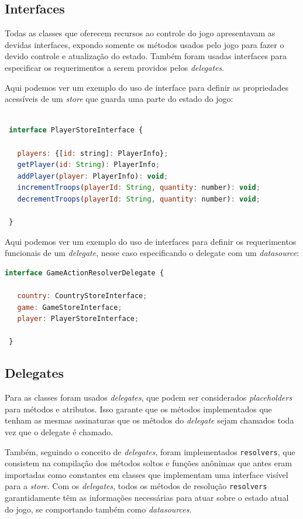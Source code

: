 \documentclass[rel_mlp]{iiufrgs}
\begin{document}
\subsection{Interfaces}
Todas as classes que oferecem recursos ao controle do jogo apresentavam as devidas interfaces, expondo somente os métodos usados pelo jogo para fazer o devido controle e atualização do estado.
Também foram usadas interfaces para especificar os requerimentos a serem providos pelos \textit{delegates}.
\par

Aqui podemos ver um exemplo do uso de interface para definir as propriedades acessíveis de um \textit{store} que guarda uma parte do estado do jogo:

\begin{lstlisting}[language=JavaScript]

 interface PlayerStoreInterface {

   players: {[id: string]: PlayerInfo};
   getPlayer(id: String): PlayerInfo;
   addPlayer(player: PlayerInfo): void;
   incrementTroops(playerId: String, quantity: number): void;
   decrementTroops(playerId: String, quantity: number): void;

 }

\end{lstlisting}

Aqui podemos ver um exemplo do uso de interfaces para definir os requerimentos funcionais de um \textit{delegate}, nesse caso especificando o delegate com um \textit{datasource}:

\begin{lstlisting}[language=JavaScript]
 interface GameActionResolverDelegate {

   country: CountryStoreInterface;
   game: GameStoreInterface;
   player: PlayerStoreInterface;

 }
\end{lstlisting}

\subsection{Delegates}

Para as classes foram usados \textit{delegates}, que podem ser considerados \textit{placeholders} para métodos e atributos. Isso garante que os métodos implementados que tenham as mesmas assinaturas que os métodos do \textit{delegate} sejam chamados toda vez que o delegate é chamado.\par
Também, seguindo o conceito de \textit{delegates}, foram implementados \verb|resolvers|, que consistem na compilação dos métodos soltos e funções anônimas que antes eram importadas como constantes em classes que implementam uma interface visível para a \textit{store}. Com os \textit{delegates}, todos
os métodos de resolução \verb|resolvers| garantidamente têm as informações necessárias para atuar sobre o estado atual do jogo, se comportando também como \textit{datasources}.
\end{document}
